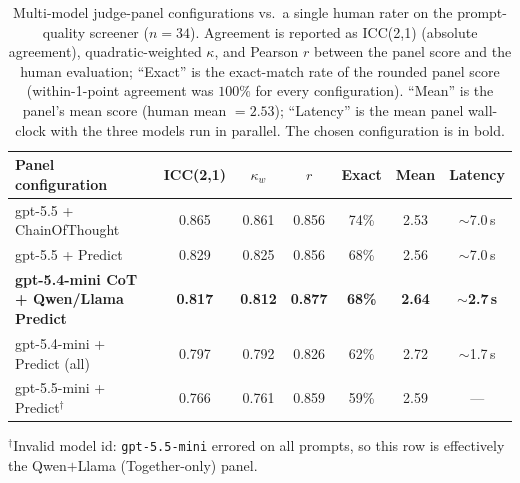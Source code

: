 \begin{table}[t]
\centering
\caption{Multi-model judge-panel configurations vs.\ a single human rater on the
prompt-quality screener ($n{=}34$). Agreement is reported as ICC(2,1) (absolute
agreement), quadratic-weighted $\kappa$, and Pearson $r$ between the panel score
and the human evaluation; ``Exact'' is the exact-match rate of the rounded panel
score (within-1-point agreement was $100\%$ for every configuration). ``Mean''
is the panel's mean score (human mean $=2.53$); ``Latency'' is the mean panel
wall-clock with the three models run in parallel. The chosen configuration is in
bold.}
\label{tab:panel-configs}
\begin{tabular}{lcccccc}
\toprule
Panel configuration & ICC(2,1) & $\kappa_w$ & $r$ & Exact & Mean & Latency \\
\midrule
gpt-5.5 + ChainOfThought & 0.865 & 0.861 & 0.856 & 74\% & 2.53 & $\sim$7.0\,s \\
gpt-5.5 + Predict & 0.829 & 0.825 & 0.856 & 68\% & 2.56 & $\sim$7.0\,s \\
\textbf{gpt-5.4-mini CoT + Qwen/Llama Predict} & \textbf{0.817} & \textbf{0.812} & \textbf{0.877} & \textbf{68\%} & \textbf{2.64} & \textbf{$\sim$2.7\,s} \\
gpt-5.4-mini + Predict (all) & 0.797 & 0.792 & 0.826 & 62\% & 2.72 & $\sim$1.7\,s \\
gpt-5.5-mini + Predict$^{\dagger}$ & 0.766 & 0.761 & 0.859 & 59\% & 2.59 & --- \\
\bottomrule
\end{tabular}

\vspace{2pt}
{\footnotesize $^{\dagger}$Invalid model id: \texttt{gpt-5.5-mini} errored on
all prompts, so this row is effectively the Qwen$+$Llama (Together-only) panel.}
\end{table}
